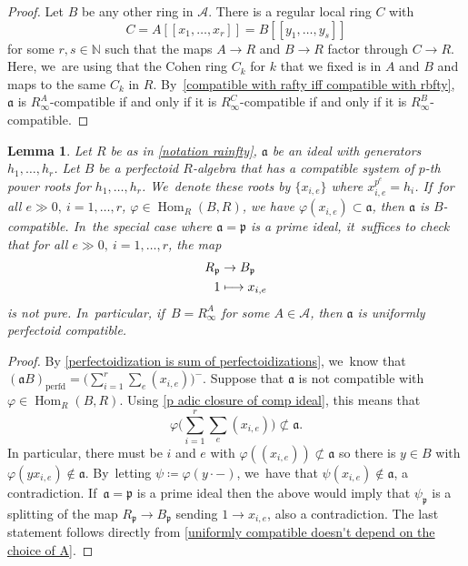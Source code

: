 \documentclass[JEP,XML,SOM,Unicode,published]{cedram}
\let\autoref\cref
\newcommand\mto{\mathchoice{\longmapsto}{\mapsto}{\mapsto}{\mapsto}}
\theoremstyle{plain}
\newtheorem{lemma}[theorem]{Lemma}
\theoremstyle{definition}
\numberwithin{equation}{theorem}
\newcommand{\N}{\mathbb {N}}
\newcommand{\fra}{\mathfrak{a}}
\newcommand{\p}{\mathfrak{p}}
\DeclareMathOperator{\Hom}{Hom}
\newcommand{\perfd}{_{\mathrm{perfd}}}
\newcommand{\llbracket}{[\![}
\newcommand{\rrbracket}{]\!]}
\newcommand{\nsubset}{\not\subset}
\newcommand{\sA}{\mathcal{A}}
\newcommand{\pe}{{p^e}}
\renewcommand{\phi}{\varphi}
\newcommand{\rafty}{R^A_\infty}
\begin{document}
\begin{proof}
Let $B$ be any other ring in $\sA$.
There is a regular local ring $C$ with
\[
C=A\llbracket x_1,\ldots,x_r\rrbracket = B\llbracket y_1,\ldots,y_s\rrbracket
\]
for some $r, s\in \N$ such that the maps $A\to R$ and $B\to R$ factor through $C\to R$. Here, we~are using that the Cohen ring $C_k$ for $k$ that we fixed is in $A$ and $B$ and maps to the same $C_k$ in $R$. By~\autoref{compatible with rafty iff compatible with rbfty}, $\fra$ is $\rafty$-compatible if and only if it is $R^C_\infty$-compatible if and only if it is $R^B_\infty$-compatible.
\end{proof}

\begin{lemma}\label{not pfd pure p not in P implies compatible}
Let $R$ be as in \autoref{notation rainfty}, $\fra$ be an ideal with generators $h_1,\ldots,h_r$. Let $B$ be a perfectoid $R$\nobreakdash-algebra that has a compatible system of $p$-th power roots for $h_1,\ldots, h_r$. We~denote these roots by $\{x_{i,e}\}$ where $x_{i,e}^\pe=h_i$. If~for all $e\gg 0, \ i=1,\ldots,r$, $\phi\in \Hom_R(B,R)$, we have $\phi(x_{i,e})\subset \fra$, then $\fra$ is $B$-compatible. In~the special case where $\fra=\p$ is a prime ideal, it~suffices to check that for all $e\gg 0, \ i=1,\ldots,r$, the map
\begin{equation}\label{map to loc of rafty at p}
\begin{aligned}
R_\p &\to B_\p\\
1 &\mto x_{i,e}
\end{aligned}
\end{equation}
is not pure. In~particular, if~$B=\rafty$ for some $A\in \sA$, then $\fra$ is uniformly perfectoid compatible.
\end{lemma}

\begin{proof}
By \autoref{perfectoidization is sum of perfectoidizations}, we~know that $(\fra B)\perfd=\bigl(\sum_{i=1}^r \sum_e (x_{i,e})\bigr)^{-}$. Suppose that $\fra$ is not compatible with $\phi\in \Hom_R(B,R)$. Using \autoref{p adic closure of comp ideal}, this means that
\[
\phi\biggl(\sum_{i=1}^r \sum_e (x_{i,e}) \biggr)\nsubset \fra.
\]
In particular, there must be $i$ and $e$ with $\phi( (x_{i,e}))\nsubset \fra$ so there is $y\in B$ with $\phi( yx_{i,e})\notin \fra$. By~letting $\psi\coloneqq \phi(y\cdot -)$, we~have that $\psi(x_{i,e})\notin \fra$, a contradiction. If~$\fra=\p$ is a prime ideal then the above would imply that $\psi_\p$ is a splitting of the map $R_\p\to B_\p$ sending $1\to x_{i,e}$, also a contradiction. The last statement follows directly from \autoref{uniformly compatible doesn't depend on the choice of A}.
\end{proof}
\end{document}
